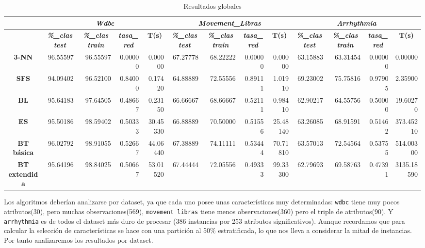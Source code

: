 \documentclass[a4paper,11pt]{article}
\begin{document}
  \begin{table}[H]

  \caption*{Resultados globales}
  \begin{adjustbox}{width=1.1\textwidth}
  \begin{tabular}{|c|r|r|r|r|r|r|r|r|r|r|r|r|}
  \hline
  \multicolumn{1}{|l|}{} & \multicolumn{ 4}{c|}{\textbf{\textit{Wdbc}}} & \multicolumn{ 4}{c|}{\textbf{\textit{Movement\_Libras}}} & \multicolumn{ 4}{c|}{\textbf{\textit{Arrhythmia}}} \\ \hline
  & \multicolumn{1}{c|}{\textbf{\textit{\%\_clas test}}} & \multicolumn{1}{c|}{\textbf{\textit{\%\_clas train}}} & \multicolumn{1}{c|}{\textbf{\textit{tasa\_red}}} & \multicolumn{1}{c|}{\textbf{T(s)}} & \multicolumn{1}{c|}{\textbf{\textit{\%\_clas test}}} & \multicolumn{1}{c|}{\textbf{\textit{\%\_clas train}}} & \multicolumn{1}{c|}{\textbf{\textit{tasa\_red}}} & \multicolumn{1}{c|}{\textbf{T(s)}} & \multicolumn{1}{c|}{\textbf{\textit{\%\_clas test}}} & \multicolumn{1}{c|}{\textbf{\textit{\%\_clas train}}} & \multicolumn{1}{c|}{\textbf{\textit{tasa\_red}}} & \multicolumn{1}{c|}{\textbf{T(s)}} \\ \hline
  \textbf{3-NN} & 96.55597 & 96.55597 & 0.00000 & 0.00000 & 67.27778 & 68.22222 & 0.00000 & 0.00000 & 63.15883 & 63.31454 & 0.00000 & 0.00000 \\ \hline
  \textbf{SFS} & 94.09402 & 96.52100 & 0.84000 & 0.17420 & 64.88889 & 72.55556 & 0.89111 & 1.01910 & 69.23002 & 75.75816 & 0.97905 & 2.35900 \\ \hline
  \textbf{BL} & 95.64183 & 97.64505 & 0.48667 & 0.23150 & 66.66667 & 68.66667 & 0.52111 & 0.98410 & 62.90217 & 64.55756 & 0.50000 & 19.60270 \\ \hline
  \textbf{ES} & 95.50186 & 98.59402 & 0.50333 & 30.45330 & 66.88889 & 70.50000 & 0.51556 & 25.48140 & 63.26085 & 68.91591 & 0.51462 & 373.45210 \\ \hline
  \textbf{BT básica} & 96.02792 & 98.91055 & 0.52667 & 44.06440 & 67.38889 & 74.11111 & 0.53444 & 70.71810 & 63.57013 & 72.54564 & 0.53755 & 514.00300 \\ \hline
  \textbf{BT extendida} & 95.64196 & 98.84025 & 0.50667 & 53.01520 & 67.44444 & 72.05556 & 0.49333 & 99.33300 & 62.79693 & 69.58763 & 0.47391 & 3135.18590 \\ \hline
  \end{tabular}
  \end{adjustbox}
  \label{}
  \end{table}

  
  Los algoritmos deberían analizarse por dataset, ya que cada uno posee unas características muy determinadas: \texttt{wdbc} tiene muy pocos atributos(30), pero muchas observaciones(569),
  \texttt{movement libras} tiene menos observaciones(360) pero el triple de atributos(90). Y \texttt{arrhythmia} es de todos el dataset más duro de procesar (386 instancias por 253 atributos
  significativos). Aunque recordamos que para calcular la selección de características se hace con una partición al 50\% estratificada, lo que nos lleva a considerar la mitad de instancias.
  Por tanto analizaremos los resultados por dataset.
  
\end{document}
